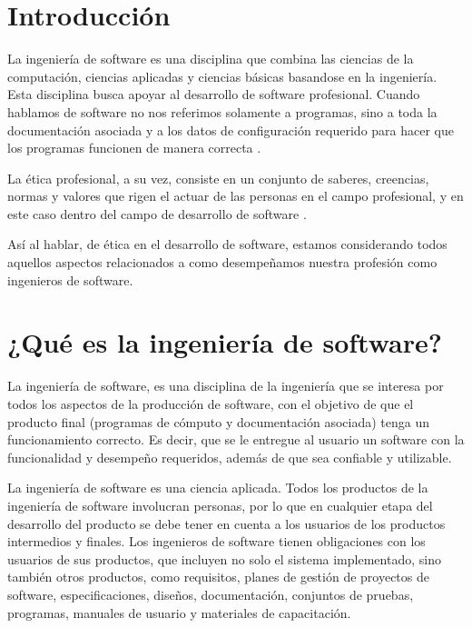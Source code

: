 \documentclass[twoside]{article}
\begin{document}
\begin{multicols}{2} %

\section{Introducción}

La ingeniería de software es una disciplina que combina las ciencias de la
computación, ciencias aplicadas y ciencias básicas basandose en la ingeniería.
Esta disciplina busca apoyar al desarrollo de software profesional. Cuando
hablamos de software no nos referimos solamente a programas, sino a toda la
documentación  asociada y a los datos de configuración requerido para hacer que
los programas funcionen de manera correcta \cite{sommerville2005ingenieria}.

La ética profesional, a su vez, consiste en un conjunto de saberes, creencias,
normas y valores que rigen el actuar de las personas en el campo profesional, y
en este caso dentro del campo de desarrollo de software
\cite{yuren2013etica}.

Así al hablar, de ética en el desarrollo de software, estamos considerando todos
aquellos aspectos relacionados a como desempeñamos nuestra profesión como
ingenieros de software.

\section{¿Qué es la ingeniería de software?}

La ingeniería de software, es una disciplina de la ingeniería que se interesa
por todos los aspectos de la producción de software, con el objetivo de que el
producto final (programas de cómputo y documentación asociada) tenga un
funcionamiento correcto. Es decir, que se le entregue al usuario un software con
la funcionalidad y desempeño requeridos, además de que sea confiable y
utilizable.

La ingeniería de software es una ciencia aplicada. Todos los productos de la
ingeniería de software involucran personas, por lo que en cualquier etapa del
desarrollo del producto se debe tener en cuenta a los usuarios de los productos
intermedios y finales. Los ingenieros de software tienen obligaciones con los
usuarios de sus productos, que incluyen no solo el sistema implementado, sino
también otros productos, como requisitos, planes de gestión de proyectos de
software, especificaciones, diseños, documentación, conjuntos de pruebas,
programas, manuales de usuario y materiales de capacitación.


\end{multicols}
\end{document}
